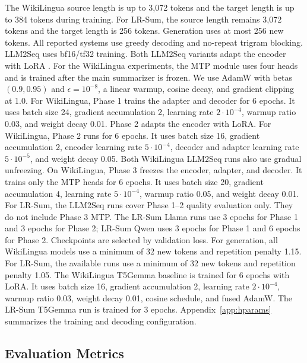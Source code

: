 \documentclass[11pt]{article}
\begin{document}
The WikiLingua source length is up to 3,072 tokens and the target length is up to 384 tokens during training.
For LR-Sum, the source length remains 3,072 tokens and the target length is 256 tokens.
Generation uses at most 256 new tokens.
All reported systems use greedy decoding and no-repeat trigram blocking.
LLM2Seq uses bf16/tf32 training.
Both LLM2Seq variants adapt the encoder with LoRA \citep{hu2022lora}.
For the WikiLingua experiments, the MTP module uses four heads and is trained after the main summarizer is frozen.
We use AdamW with betas $(0.9,0.95)$ and $\epsilon=10^{-8}$, a linear warmup, cosine decay, and gradient clipping at 1.0.
For WikiLingua, Phase 1 trains the adapter and decoder for 6 epochs.
It uses batch size 24, gradient accumulation 2, learning rate $2\cdot10^{-4}$, warmup ratio 0.03, and weight decay 0.01.
Phase 2 adapts the encoder with LoRA.
For WikiLingua, Phase 2 runs for 6 epochs.
It uses batch size 16, gradient accumulation 2, encoder learning rate $5\cdot10^{-4}$, decoder and adapter learning rate $5\cdot10^{-5}$, and weight decay 0.05.
Both WikiLingua LLM2Seq runs also use gradual unfreezing.
On WikiLingua, Phase 3 freezes the encoder, adapter, and decoder.
It trains only the MTP heads for 6 epochs.
It uses batch size 20, gradient accumulation 4, learning rate $5\cdot10^{-4}$, warmup ratio 0.05, and weight decay 0.01.
For LR-Sum, the LLM2Seq runs cover Phase 1--2 quality evaluation only.
They do not include Phase 3 MTP.
The LR-Sum Llama runs use 3 epochs for Phase 1 and 3 epochs for Phase 2; LR-Sum Qwen uses 3 epochs for Phase 1 and 6 epochs for Phase 2.
Checkpoints are selected by validation loss.
For generation, all WikiLingua models use a minimum of 32 new tokens and repetition penalty 1.15.
For LR-Sum, the available runs use a minimum of 32 new tokens and repetition penalty 1.05.
The WikiLingua T5Gemma baseline is trained for 6 epochs with LoRA.
It uses batch size 16, gradient accumulation 2, learning rate $2\cdot10^{-4}$, warmup ratio 0.03, weight decay 0.01, cosine schedule, and fused AdamW.
The LR-Sum T5Gemma run is trained for 3 epochs.
Appendix~\ref{app:hparams} summarizes the training and decoding configuration.

\subsection{Evaluation Metrics}
\end{document}
